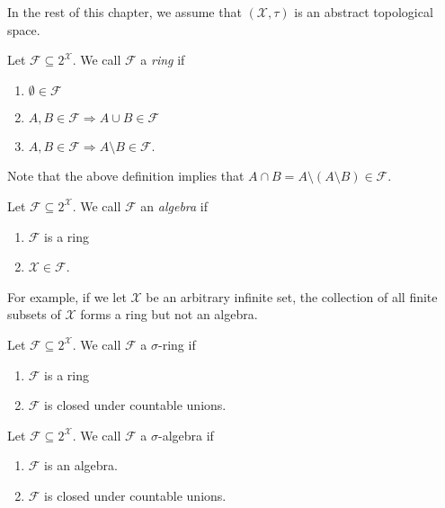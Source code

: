 In the rest of this chapter, we assume that $\left(\mathcal{X},\tau\right)$
is an abstract topological space.
\begin{defn}
\label{def:ring}Let $\mathcal{F}\subseteq2^{\mathcal{X}}$. We call
$\mathcal{F}$ a \emph{ring }if

\begin{enumerate}[label=(\roman*),leftmargin=.1\linewidth,rightmargin=.4\linewidth]
	\item $\emptyset \in \mathcal{F}$
	\item $A,B \in \mathcal{F} \Rightarrow A\cup B \in \mathcal{F}$
	\item $A,B \in \mathcal{F} \Rightarrow A\setminus B \in \mathcal{F}$.
\end{enumerate}
\end{defn}

\noindent Note that the above definition implies that $A\cap B=A\setminus\left(A\setminus B\right)\in\mathcal{F}$.
\begin{defn}
\label{def:algebra}Let $\mathcal{F}\subseteq2^{\mathcal{X}}$. We
call $\mathcal{F}$ an \emph{algebra }if

\begin{enumerate}[label=(\roman*),leftmargin=.1\linewidth,rightmargin=.4\linewidth]
	\item $\mathcal{F}$ is a ring
	\item $\mathcal{X} \in \mathcal{F}$.
\end{enumerate}
\end{defn}

\noindent For example, if we let $\mathcal{X}$ be an arbitrary infinite
set, the collection of all finite subsets of $\mathcal{X}$ forms
a ring but not an algebra.
\begin{defn}
\label{def:sigmaRing}Let $\mathcal{F}\subseteq2^{\mathcal{X}}$.
We call $\mathcal{F}$ a $\sigma$-ring if

\begin{enumerate}[label=(\roman*),leftmargin=.1\linewidth,rightmargin=.4\linewidth]
	\item $\mathcal{F}$ is a ring
	\item $\mathcal{F}$ is closed under countable unions.
\end{enumerate}
\end{defn}

\begin{defn}
\label{def:sigmaAlgebra}Let $\mathcal{F}\subseteq2^{\mathcal{X}}$.
We call $\mathcal{F}$ a $\sigma$-algebra if

\begin{enumerate}[label=(\roman*),leftmargin=.1\linewidth,rightmargin=.4\linewidth]
	\item $\mathcal{F}$ is an algebra.
	\item $\mathcal{F}$ is closed under countable unions.
\end{enumerate}
\end{defn}

